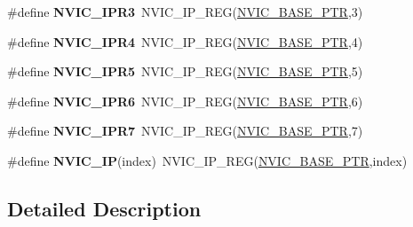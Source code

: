 \begin{DoxyCompactItemize}
\item 
\mbox{\label{group___n_v_i_c___register___accessor___macros_gac33f3f5d21cbb95316076b1b288387ac}} 
\#define {\bfseries N\+V\+I\+C\+\_\+\+I\+P\+R3}~N\+V\+I\+C\+\_\+\+I\+P\+\_\+\+R\+EG(\hyperlink{group___n_v_i_c___peripheral_ga28f0a055d0c218e16d1fc7b13ff0caa5}{N\+V\+I\+C\+\_\+\+B\+A\+S\+E\+\_\+\+P\+TR},3)
\item 
\mbox{\label{group___n_v_i_c___register___accessor___macros_ga2f5750fd7f9ff72cda865eb7192afae3}} 
\#define {\bfseries N\+V\+I\+C\+\_\+\+I\+P\+R4}~N\+V\+I\+C\+\_\+\+I\+P\+\_\+\+R\+EG(\hyperlink{group___n_v_i_c___peripheral_ga28f0a055d0c218e16d1fc7b13ff0caa5}{N\+V\+I\+C\+\_\+\+B\+A\+S\+E\+\_\+\+P\+TR},4)
\item 
\mbox{\label{group___n_v_i_c___register___accessor___macros_ga86802cec04cf0988062781f67bcaad9a}} 
\#define {\bfseries N\+V\+I\+C\+\_\+\+I\+P\+R5}~N\+V\+I\+C\+\_\+\+I\+P\+\_\+\+R\+EG(\hyperlink{group___n_v_i_c___peripheral_ga28f0a055d0c218e16d1fc7b13ff0caa5}{N\+V\+I\+C\+\_\+\+B\+A\+S\+E\+\_\+\+P\+TR},5)
\item 
\mbox{\label{group___n_v_i_c___register___accessor___macros_ga0986846cc9f1bf5c816ec885eda9aed8}} 
\#define {\bfseries N\+V\+I\+C\+\_\+\+I\+P\+R6}~N\+V\+I\+C\+\_\+\+I\+P\+\_\+\+R\+EG(\hyperlink{group___n_v_i_c___peripheral_ga28f0a055d0c218e16d1fc7b13ff0caa5}{N\+V\+I\+C\+\_\+\+B\+A\+S\+E\+\_\+\+P\+TR},6)
\item 
\mbox{\label{group___n_v_i_c___register___accessor___macros_gaef45ccd66db0bd808d945cdfa64d622b}} 
\#define {\bfseries N\+V\+I\+C\+\_\+\+I\+P\+R7}~N\+V\+I\+C\+\_\+\+I\+P\+\_\+\+R\+EG(\hyperlink{group___n_v_i_c___peripheral_ga28f0a055d0c218e16d1fc7b13ff0caa5}{N\+V\+I\+C\+\_\+\+B\+A\+S\+E\+\_\+\+P\+TR},7)
\item 
\mbox{\label{group___n_v_i_c___register___accessor___macros_gaf1f0534e262976cb2ae04360e5a226a2}} 
\#define {\bfseries N\+V\+I\+C\+\_\+\+IP}(index)~N\+V\+I\+C\+\_\+\+I\+P\+\_\+\+R\+EG(\hyperlink{group___n_v_i_c___peripheral_ga28f0a055d0c218e16d1fc7b13ff0caa5}{N\+V\+I\+C\+\_\+\+B\+A\+S\+E\+\_\+\+P\+TR},index)
\end{DoxyCompactItemize}


\subsection{Detailed Description}
